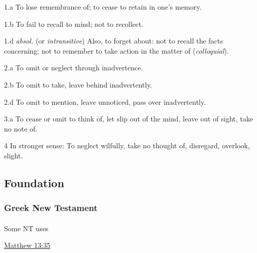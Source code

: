 			\begin{compactitem}
				\item[1.a] To lose remembrance of; to cease to retain in one's memory.
				\item[1.b] To fail to recall to mind; not to recollect.
				\item[1.d] \textit{absol.} (or \textit{intransitive}) Also, to forget about: not to recall the facts concerning; not to remember to take action in the matter of (\textit{colloquial}).
				\item[2.a] To omit or neglect through inadvertence.
				\item[2.b] To omit to take, leave behind inadvertently.
				\item[2.d] To omit to mention, leave unnoticed, pass over inadvertently.
				\item[3.a] To cease or omit to think of, let slip out of the mind, leave out of sight, take no note of.
				\item[4] In stronger sense: To neglect wilfully, take no thought of, disregard, overlook, slight.
			\end{compactitem}

	\subsection{Foundation} %
		\label{FOUNDATION}
		
		\subsubsection{Greek New Testament}
		
			\paragraph{\texorpdfstring{}{}}
				\label{KATABOLE}
				
				
				\begin{compactdesc}
					\item[Some NT uses] \textbf{} %
						\begin{compactdesc}
							\item[{\hyperref[MATTHEW-13-35]{Matthew 13:35}}]
						\end{compactdesc}
				\end{compactdesc}
			
